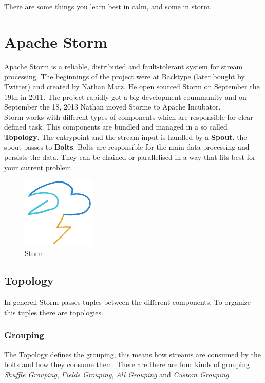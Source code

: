 \begin{savequote}[75mm]
There are some things you learn best in calm, and some in storm.
\end{savequote}

\chapter{Apache Storm}

Apache Storm is a reliable, distributed and fault-tolerant system for stream processing.
The beginnings of the project were at Backtype (later bought by Twitter) and created by Nathan Marz.
He open sourced Storm on September the 19th in 2011. The project rapidly got a big development coummunity and
on September the 18, 2013 Nathan moved Storme to Apache Incubator.\\

Storm works with different types of components which are responsible for clear defined task.
This components are bundled and managed in a so called \textbf{Topology}.
The entrypoint and the stream input is handled by a \textbf{Spout}, the spout passes to \textbf{Bolts}.
Bolts are responsible for the main data processing and persists the data.
They can be chained or parallelised in a way that fits best for your current problem.

\begin{figure}[hp]
\centering
\captionsetup{justification=centering}
\includegraphics[width=100pt]{images/storm.png}
\caption[Storm]{Storm}
\end{figure}

\newpage

\section{Topology}
In generell Storm passes tuples between the different components.
To organize this tuples there are topologies.

\subsection{Grouping}
The Topology defines the grouping, this means how streams are consumed by the bolts and how they consume them.
There are there are four kinds of grouping \textit{Shuffle Grouping}, \textit{Fields Grouping},
\textit{All Grouping} and \textit{Custom Grouping}.

